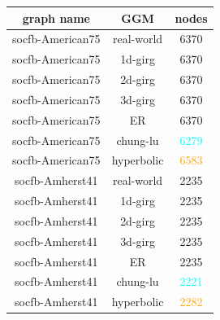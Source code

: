 \begin{table}[]
    \centering
    \begin{tabular}{|c|c|c|}
    \hline
    \textbf{graph name} & \textbf{GGM} & \textbf{nodes} \\ \hline
    socfb-American75 & real-world & 6370 \\ \hline
    socfb-American75 & 1d-girg & 6370 \\ \hline
    socfb-American75 & 2d-girg & 6370 \\ \hline
    socfb-American75 & 3d-girg & 6370 \\ \hline
    socfb-American75 & ER & 6370 \\ \hline
    socfb-American75 & chung-lu & \textcolor{cyan}{6279} \\ \hline
    socfb-American75 & hyperbolic & \textcolor{orange}{6583} \\ \hline
    socfb-Amherst41 & real-world & 2235 \\ \hline
    socfb-Amherst41 & 1d-girg & 2235 \\ \hline
    socfb-Amherst41 & 2d-girg & 2235 \\ \hline
    socfb-Amherst41 & 3d-girg & 2235 \\ \hline
    socfb-Amherst41 & ER & 2235 \\ \hline
    socfb-Amherst41 & chung-lu & \textcolor{cyan}{2221} \\ \hline
    socfb-Amherst41 & hyperbolic & \textcolor{orange}{2282} \\ \hline

\end{tabular}
\end{table}
